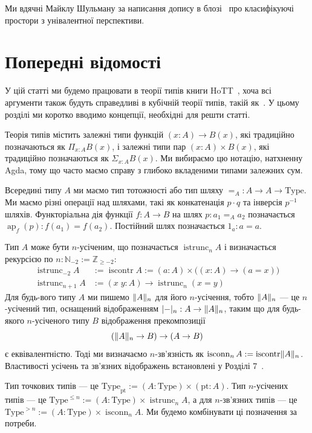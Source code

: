 \documentclass[12pt]{article}
\newcommand*{\concat}{\cdot}
\newcommand*{\rev}[1]{{#1}^{-1}}
\newcommand*{\bN}{{\mathbb{N}}}
\newcommand*{\pt}{{\mathrm{pt}}}
\DeclarePairedDelimiter\trunc{\lVert}{\rVert}
\DeclarePairedDelimiter\tr{\lvert}{\rvert}
\DeclareMathOperator\ap{ap}
\DeclareMathOperator\istrunc{istrunc}
\DeclareMathOperator\iscontr{iscontr}
\DeclareMathOperator\isconn{isconn}
\newcommand*{\Type}{\mathrm{Type}}
\newcommand*{\blank}{{-}}
\begin{document}
Ми вдячні Майклу Шульману за написання допису в блозі~\cite{Shulman-classifying} про класифікуючі простори з унівалентної перспективи.

\section{Попередні відомості}
\label{sec:preliminaries}

У цій статті ми будемо працювати в теорії типів книги HoTT~\cite{TheBook}, хоча всі аргументи також будуть справедливі в кубічній теорії типів, такій як~\cite{CCHM2016,chtt}. У цьому розділі ми коротко вводимо концепції, необхідні для решти статті.

Теорія типів містить залежні типи функцій $(x : A) \to B(x)$, які традиційно позначаються як $\Pi_{x : A}B(x)$, і залежні типи пар $(x : A) \times B(x)$, які традиційно позначаються як $\Sigma_{x : A}B(x)$. Ми вибираємо цю нотацію, натхненну Agda, тому що часто маємо справу з глибоко вкладеними типами залежних сум.

Всередині типу $A$ ми маємо тип тотожності або тип шляху ${=}_A : A \to A \to \Type$. Ми маємо різні операції над шляхами, такі як конкатенація $p \concat q$ та інверсія $\rev{p}$ шляхів. Функторіальна дія функції $f : A \to B$ на шлях $p : a_1 =_A a_2$ позначається $\ap_f(p) : f(a_1) = f(a_2)$. Постійний шлях позначається $1_a : a = a$.

Тип $A$ може бути $n$-усіченим, що позначається $\istrunc_n A$ і визначається рекурсією по $n : \bN_{-2} := \mathbb{Z}_{\ge-2}$:
\begin{align*}
  \istrunc_{-2} A & := \iscontr A := (a : A) \times \bigl((x : A) \to (a = x)\bigr) \\
  \istrunc_{n+1} A & := (x\;y : A) \to \istrunc_n (x=y)
\end{align*}
Для будь-вого типу $A$ ми пишемо $\trunc{A}_n$ для його $n$-усічення, тобто $\trunc{A}_n$ — це $n$-усічений тип, оснащений відображенням $\tr{\blank}_n : A \to \trunc{A}_n$, таким що для будь-якого $n$-усіченого типу $B$ відображення прекомпозиції
\begin{equation*}
(\trunc{A}_n \to B) \to (A \to B)
\end{equation*}
є еквівалентністю. Тоді ми визначаємо $n$-зв'язність як $\isconn_n A := \iscontr \trunc A_n$. Властивості усічень та зв'язних відображень встановлені у Розділі 7~\cite{TheBook}.

Тип точкових типів — це $\Type_\pt := (A : \Type) \times (\pt : A)$. Тип $n$-усічених типів — це $\Type^{\le n} := (A : \Type) \times \istrunc_n A$, а для $n$-зв'язних типів — це $\Type^{>n} := (A : \Type) \times \isconn_n A$. Ми будемо комбінувати ці позначення за потреби.
\end{document}
